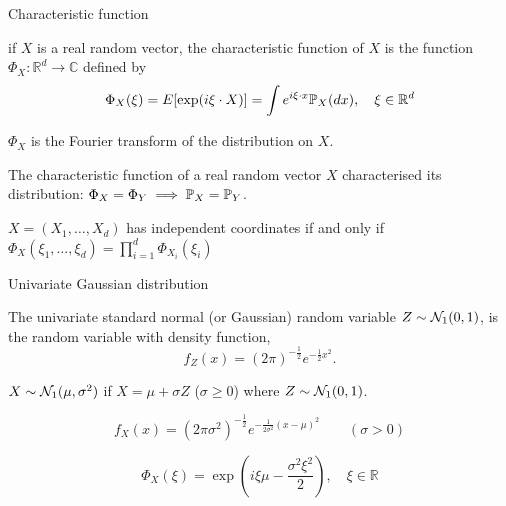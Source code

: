 \documentclass[handout]{beamer} %
\begin{document}
  \begin{frame}{Characteristic function}

    \begin{definition}
      if $X$ is a real random vector, the characteristic function of $X$ is the function
      $\Phi_{X}: \mathbb{R}^{d} \longrightarrow \mathbb{C}$ defined by
      $$
      \Phi_{X}(\xi)=E[\exp (i \xi \cdot X)] = \int e^{i \xi \cdot x} \P_{X}(d x), \quad \xi \in \mathbb{R}^{d}
      $$

      $\Phi_{X}$ is the Fourier transform of the distribution on $X$.
    \end{definition}

    \pause

    \begin{theorem}
      The characteristic function of a real random vector $X$ characterised its
      distribution: $\Phi_X = \Phi_Y \implies \P_X = \P_Y$.
    \end{theorem}

    \pause

    
    \begin{proposition}
      $X=(X_1,\ldots,X_d)$ has independent coordinates if and only if \\
      $\Phi_{X}\left(\xi_{1}, \ldots, \xi_{d}\right)=\prod_{i=1}^{d}
      \Phi_{X_{i}}\left(\xi_{i}\right)$
    \end{proposition}
  \end{frame}

  \begin{frame}{Univariate Gaussian distribution}

    The univariate standard normal (or Gaussian) random variable  $Z \sim
    \cN_1(0,1)$, is the random variable with density function,
    $$f_Z(x)=(2\pi)^{-\frac{1}{2}} e^{-\frac{1}{2}x^{2}}.$$

    \pause

    $X \sim \cN_1(\mu,\sigma^2)$ if $X = \mu + \sigma Z$
    ($\sigma \geq 0$) where  $Z \sim \cN_1(0,1)$.

    $$f_X(x)=(2
    \pi\sigma^2)^{-\frac{1}{2}} e^{-\frac{1}{2\sigma^2}(x-\mu)^{2}} \qquad
    (\sigma > 0) $$

    \pause

      $$
      \Phi_{X}(\xi)=\exp \left(i\xi \mu -\frac{\sigma^{2} \xi^{2}}{2}\right), \quad \xi \in \mathbb{R}
      $$
  \end{frame}
\end{document}
